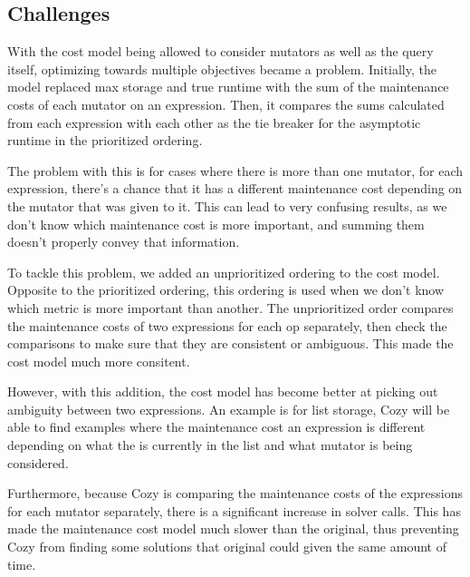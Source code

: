 \subsection{Challenges}
With the cost model being allowed to consider mutators as well as the query
itself, optimizing towards multiple objectives became a problem. Initially, the
model replaced max storage and true runtime with the sum of the maintenance
costs of each mutator on an expression. Then, it compares the sums calculated
from each expression with each other as the tie breaker for the asymptotic
runtime in the prioritized ordering.

The problem with this is for cases where there is more than one mutator, for
each expression, there's a chance that it has a different maintenance cost
depending on the mutator that was given to it.  This can lead to very confusing
results, as we don't know which maintenance cost is more important, and summing
them doesn't properly convey that information.

To tackle this problem, we added an unprioritized ordering to the cost model.
Opposite to the prioritized ordering, this ordering is used when we don't know
which metric is more important than another. The unprioritized order compares
the maintenance costs of two expressions for each op separately, then check the
comparisons to make sure that they are consistent or ambiguous. This made the
cost model much more consitent.

However, with this addition, the cost model has become better at picking out
ambiguity between two expressions. An example is for list storage, Cozy
will be able to find examples where the maintenance cost an expression is
different depending on what the is currently in the list and what mutator is
being considered.

Furthermore, because Cozy is comparing the maintenance costs of the expressions
for each mutator separately, there is a significant increase in solver calls.
This has made the maintenance cost model much slower than the original, thus
preventing Cozy from finding some solutions that original could given the same
amount of time.
